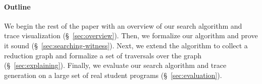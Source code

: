 \paragraph{Outline}
We begin the rest of the paper with an overview of our search algorithm
and trace visualization (\S~\ref{sec:overview}).
%
Then, we formalize our algorithm and prove it sound
(\S~\ref{sec:searching-witness}).
%
Next, we extend the algorithm to collect a reduction graph and formalize
a set of traversals over the graph (\S~\ref{sec:explaining}).
%
Finally, we evaluate our search algorithm and trace generation on a
large set of real student programs (\S~\ref{sec:evaluation}).
%

